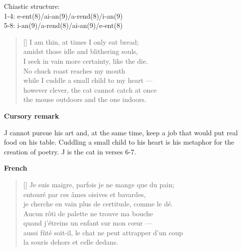 \documentclass[a4paper,12pt,twoside,final]{book}
\begin{document}
\noindent Chiastic structure: \\
1-4: e-ent(8)/ai-an(9)/a-rend(8)/i-an(9) \\
5-8: i-an(9)/a-rend(8)/ai-an(9)/e-ent(8)

\newpage


\settowidth{\versewidth}{however clever, the cat cannot catch at once}

\begin{verse}[\versewidth]
  I am thin, at times I only eat bread; \\
  amidst those idle and blithering souls, \\
  I seek in vain more certainty, like the die. \\
  No chuck roast reaches my mouth \\
  while I cuddle a small child to my heart --- \\
  however clever, the cat cannot catch at once \\
  the mouse outdoors and the one indoors. \\
\end{verse}

\bigskip

\noindent \textbf{Cursory remark}

\medskip

J cannot pursue his art and, at the same time, keep a job that would
put real food on his table. Cuddling a small child to his heart is his
metaphor for the creation of poetry. J is the cat in verses 6-7.

\bigskip

\noindent \textbf{French}


\settowidth{\versewidth}{aussi fûté soit-il, le chat ne peut attrapper d'un coup}

\begin{verse}[\versewidth]
  Je suis maigre, parfois je ne mange que du pain; \\
  entouré par ces âmes oisives et bavardes, \\
  je cherche en vain plus de certitude, comme le dé. \\
  Aucun rôti de palette ne trouve ma bouche \\
  quand j'étreins un enfant sur mon cœur --- \\
  aussi fûté soit-il, le chat ne peut attrapper d'un coup \\
  la souris dehors et celle dedans. \\
\end{verse}
\end{document}
